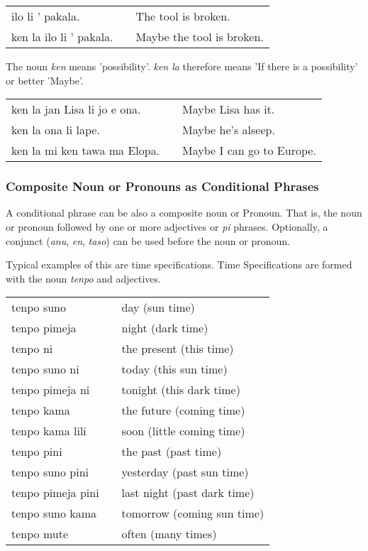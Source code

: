 \begin{supertabular}{p{5,5cm}|ll}
ilo li ' pakala. && The tool is broken. \\
ken la ilo li ' pakala. && Maybe the tool is broken. \\
\end{supertabular} 

The noun \textit{ken} means 'possibility'.
\textit{ken la} therefore means 'If there is a possibility' or better 'Maybe'.
 
\begin{supertabular}{p{5,5cm}|ll}
ken la jan Lisa li jo e ona. && Maybe Lisa has it. \\
ken la ona li lape. && Maybe he's alseep. \\
ken la mi ken tawa ma Elopa. && Maybe I can go to Europe. \\
\end{supertabular} 

%
\subsubsection*{Composite Noun or Pronouns as Conditional Phrases}
%
A conditional phrase can be also a composite noun or Pronoun. 
That is, the noun or pronoun followed by one or more adjectives or \textit{pi} phrases.
Optionally, a conjunct (\textit{anu}, \textit{en}, \textit{taso}) can be used before the noun or pronoun. 

Typical examples of this are time specifications. 
Time Specifications are formed with the noun \textit{tenpo} and adjectives. 

\begin{supertabular}{p{5,5cm}|ll}
tenpo suno && day (sun time) \\
tenpo pimeja && night (dark time) \\
tenpo ni && the present (this time) \\
tenpo suno ni && today (this sun time) \\
tenpo pimeja ni && tonight (this dark time) \\
tenpo kama && the future (coming time) \\
tenpo kama lili && soon (little coming time) \\
tenpo pini && the past (past time) \\
tenpo suno pini && yesterday (past sun time) \\
tenpo pimeja pini && last night (past dark time) \\
tenpo suno kama && tomorrow (coming sun time) \\
tenpo mute && often (many times) \\
\end{supertabular} 

